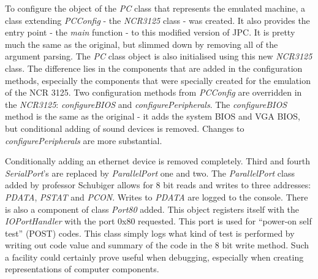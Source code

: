 To configure the object of the \emph{PC} class that represents the emulated
machine, a class extending \emph{PCConfig} - the \emph{NCR3125} class -  was
created. It also provides the entry point - the \emph{main} function - to this
modified version of JPC. It is pretty much the same as the original, but
slimmed down by removing all of the argument parsing. The \emph{PC} class
object is also initialised using this new \emph{NCR3125} class. The difference
lies in the components that are added in the configuration methods, especially
the components that were specially created for the emulation of the NCR 3125.
Two configuration methods from \emph{PCConfig} are overridden in the
\emph{NCR3125}: \emph{configureBIOS} and \emph{configurePeripherals}. The
\emph{configureBIOS} method is the same as the original - it adds the system
BIOS and VGA BIOS, but conditional adding of sound devices is removed. Changes
to \emph{configurePeripherals} are more substantial.

\begin{codeblock}
    
\end{codeblock}


Conditionally adding an ethernet device is removed completely. Third and fourth
\emph{SerialPort}'s are replaced by \emph{ParallelPort} one and two. The
\emph{ParallelPort} class added by professor Schubiger allows for 8 bit reads
and writes to three addresses: \emph{PDATA}, \emph{PSTAT} and \emph{PCON}.
Writes to \emph{PDATA} are logged to the console. There is also a component of
class \emph{Port80} added. This object registers itself with the
\emph{IOPortHandler} with the port 0x80 requested. This port is used for
``power-on self test'' (POST) codes. This class simply logs what kind of test is
performed by writing out code value and summary of the code in the 8 bit write
method. Such a facility could certainly prove useful when debugging, especially
when creating representations of computer components. 

